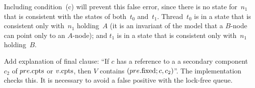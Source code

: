 Including condition~(c) will prevent this false error, since there is no state
for~$n_1$ that is consistent with the states of both~$t_0$ and~$t_1$.
Thread~$t_0$ is in a state that is consistent only with~$n_1$ holding~$A$ (it
is an invariant of the model that a $B$-node can point only to an $A$-node);
and $t_1$ is in a state that is consistent only with~$n_1$ holding~$B$.



 Add explanation of final clause: ``If $c$ has a reference to
a a secondary component $c_2$ of $pre.\mathrm{cpts}$ or $v.\mathrm{cpts}$, then $V$ contains
$(pre.\mathrm{fixed}; c, c_2)$''.  The implementation checks this.  It is
necessary to avoid a false positive with the lock-free queue.

